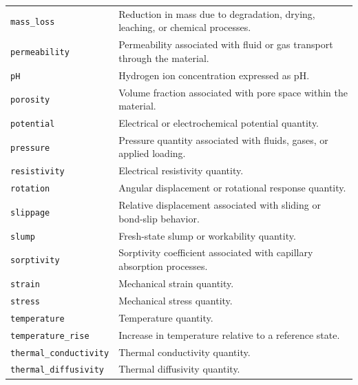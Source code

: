 \documentclass[11pt]{book}
\begin{document}
{\begin{longtable}{p{}p{}}
\texttt{mass\_loss} &
Reduction in mass due to degradation, drying, leaching, or chemical processes. \\

\texttt{permeability} &
Permeability associated with fluid or gas transport through the material. \\

\texttt{pH} &
Hydrogen ion concentration expressed as pH. \\

\texttt{porosity} &
Volume fraction associated with pore space within the material. \\

\texttt{potential} &
Electrical or electrochemical potential quantity. \\

\texttt{pressure} &
Pressure quantity associated with fluids, gases, or applied loading. \\

\texttt{resistivity} &
Electrical resistivity quantity. \\

\texttt{rotation} &
Angular displacement or rotational response quantity. \\

\texttt{slippage} &
Relative displacement associated with sliding or bond-slip behavior. \\

\texttt{slump} &
Fresh-state slump or workability quantity. \\

\texttt{sorptivity} &
Sorptivity coefficient associated with capillary absorption processes. \\

\texttt{strain} &
Mechanical strain quantity. \\

\texttt{stress} &
Mechanical stress quantity. \\

\texttt{temperature} &
Temperature quantity. \\

\texttt{temperature\_rise} &
Increase in temperature relative to a reference state. \\

\texttt{thermal\_conductivity} &
Thermal conductivity quantity. \\

\texttt{thermal\_diffusivity} &
Thermal diffusivity quantity. \\


\end{longtable}}
\end{document}
